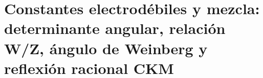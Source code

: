 \chapter{Constantes electrodébiles y mezcla: determinante angular, relación W/Z, ángulo de Weinberg y reflexión racional CKM}
\label{chap:p3-final:49:sector_electrodebil}





